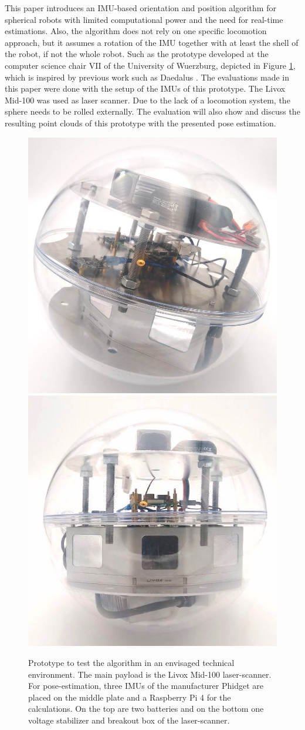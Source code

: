 \documentclass[letterpaper, 10 pt, conference]{ieeeconf}  %
\begin{document}
This paper introduces an IMU-based orientation and position algorithm for spherical robots with limited computational power and the need for real-time estimations.
Also, the algorithm does not rely on one specific locomotion approach, but it assumes a rotation of the IMU together with at least the shell of the robot, if not the whole robot. 
Such as the prototype developed at the computer science chair VII of the University of Wuerzburg,  depicted in Figure \ref{fig:prototype}, which is inspired by previous work such as Daedalus \cite{rossi2021daedalus}.
The evaluations made in this paper were done with the setup of the IMUs of this prototype.
The Livox Mid-100 was used as laser scanner.
Due to the lack of a locomotion system, the sphere needs to be rolled externally. 
The evaluation will also show and discuss the resulting point clouds of this prototype with the presented pose estimation.
\begin{figure}[b]
\includegraphics[width=0.49\linewidth]{./graphics/photoReal1.jpeg}
\includegraphics[width=0.50\linewidth]{./graphics/photoReal3.jpeg}
\caption{Prototype to test the algorithm in an envisaged technical environment. The main payload is the Livox Mid-100 laser-scanner. For pose-estimation, three IMUs of the manufacturer Phidget are placed on the middle plate and a Raspberry Pi 4 for the calculations. On the top are two batteries and on the bottom one voltage stabilizer and breakout box of the laser-scanner. }
\label{fig:prototype}
\end{figure}
\end{document}
